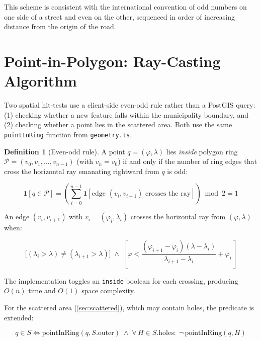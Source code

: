 \documentclass[12pt,a4paper]{article}
\theoremstyle{definition}
\newtheorem{definition}{Definition}[section]
\theoremstyle{plain}
\theoremstyle{remark}
\begin{document}
This scheme is consistent with the international convention of odd numbers
on one side of a street and even on the other, sequenced in order of
increasing distance from the origin of the road.

\section{Point-in-Polygon: Ray-Casting Algorithm}
\label{sec:pip}

Two spatial hit-tests use a client-side even-odd rule rather than a
PostGIS query: (1) checking whether a new feature falls within the
municipality boundary, and (2) checking whether a point lies in the
scattered area. Both use the same \texttt{pointInRing} function from
\texttt{geometry.ts}.

\begin{definition}[Even-odd rule]
A point $q = (\varphi, \lambda)$ lies \emph{inside} polygon ring
$\mathcal{P} = (v_0, v_1, \ldots, v_{n-1})$ (with $v_n = v_0$) if and
only if the number of ring edges that cross the horizontal ray emanating
rightward from $q$ is odd:

\begin{equation}
  \mathbf{1}[q \in \mathcal{P}] =
  \left(\sum_{i=0}^{n-1} \mathbf{1}[\text{edge } (v_i, v_{i+1})
  \text{ crosses the ray}]\right) \bmod 2 = 1
  \label{eq:pip_even_odd}
\end{equation}
\end{definition}

An edge $(v_i, v_{i+1})$ with $v_i = (\varphi_i, \lambda_i)$
crosses the horizontal ray from $(\varphi, \lambda)$ when:

\begin{equation}
  \bigl[(\lambda_i > \lambda) \neq (\lambda_{i+1} > \lambda)\bigr]
  \;\land\;
  \left[
    \varphi < \frac{(\varphi_{i+1} - \varphi_i)(\lambda - \lambda_i)}
                   {\lambda_{i+1} - \lambda_i} + \varphi_i
  \right]
  \label{eq:pip_crossing}
\end{equation}

The implementation toggles an \texttt{inside} boolean for each crossing,
producing $O(n)$ time and $O(1)$ space complexity.

For the scattered area (\cref{sec:scattered}), which may contain holes,
the predicate is extended:

\begin{equation}
  q \in S \iff
  \text{pointInRing}(q, S.\mathrm{outer})
  \;\land\;
  \forall\, H \in S.\mathrm{holes}:\;
  \neg\,\text{pointInRing}(q, H)
  \label{eq:pip_with_holes}
\end{equation}
\end{document}
